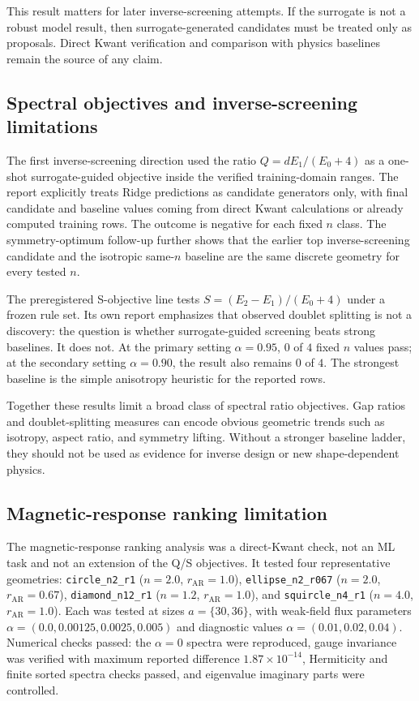 This result matters for later inverse-screening attempts. If the surrogate is
not a robust model result, then surrogate-generated candidates must be treated
only as proposals. Direct Kwant verification and comparison with physics
baselines remain the source of any claim.

\subsection{Spectral objectives and inverse-screening limitations}

The first inverse-screening direction used the ratio
$Q=dE_1/(E_0+4)$ as a one-shot surrogate-guided objective inside the verified
training-domain ranges. The report explicitly treats Ridge predictions as
candidate generators only, with final candidate and baseline values coming from
direct Kwant calculations or already computed training rows. The outcome is
negative for each fixed $n$ class. The symmetry-optimum follow-up further shows
that the earlier top inverse-screening candidate and the isotropic same-$n$
baseline are the same discrete geometry for every tested $n$.

The preregistered S-objective line tests
$S=(E_2-E_1)/(E_0+4)$ under a frozen rule set. Its own report emphasizes that
observed doublet splitting is not a discovery: the question is whether
surrogate-guided screening beats strong baselines. It does not. At the primary
setting $\alpha=0.95$, $0$ of $4$ fixed $n$ values pass; at the secondary
setting $\alpha=0.90$, the result also remains $0$ of $4$. The strongest
baseline is the simple anisotropy heuristic for the reported rows.

Together these results limit a broad class of spectral ratio objectives. Gap
ratios and doublet-splitting measures can encode obvious geometric trends such
as isotropy, aspect ratio, and symmetry lifting. Without a stronger baseline
ladder, they should not be used as evidence for inverse design or new
shape-dependent physics.

\subsection{Magnetic-response ranking limitation}

The magnetic-response ranking analysis was a direct-Kwant check, not an ML task
and not an extension of the Q/S objectives. It tested four representative
geometries: \texttt{circle\_n2\_r1} ($n=2.0$, $r_{\mathrm{AR}}=1.0$),
\texttt{ellipse\_n2\_r067} ($n=2.0$, $r_{\mathrm{AR}}=0.67$),
\texttt{diamond\_n12\_r1} ($n=1.2$, $r_{\mathrm{AR}}=1.0$), and
\texttt{squircle\_n4\_r1} ($n=4.0$, $r_{\mathrm{AR}}=1.0$). Each was tested
at sizes $a=\{30,36\}$, with weak-field flux parameters
$\alpha=(0.0,0.00125,0.0025,0.005)$ and diagnostic values
$\alpha=(0.01,0.02,0.04)$. Numerical checks passed: the $\alpha=0$ spectra
were reproduced, gauge invariance was verified with maximum reported
difference $1.87\times 10^{-14}$, Hermiticity and finite sorted
spectra checks passed, and eigenvalue imaginary parts were controlled.

